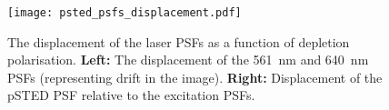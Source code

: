 \begin{figure}
	\centering
	\texttt{[image: psted\_psfs\_displacement.pdf]}
	\caption{
		The displacement of the laser PSFs as a function of depletion polarisation. \textbf{Left:} The displacement of the 561~nm and 640~nm PSFs (representing drift in the image). \textbf{Right:} Displacement of the pSTED PSF relative to the excitation PSFs.
	}
\end{figure}